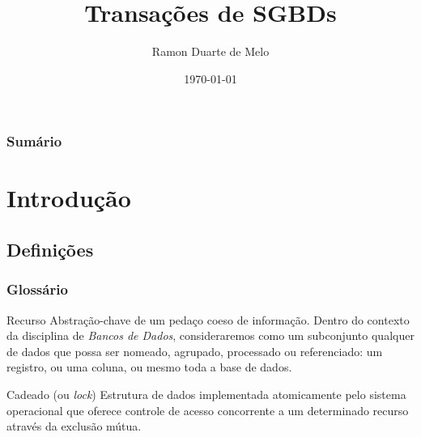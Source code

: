 \documentclass{beamer}
\title[Transações]{Transações de SGBDs} %
\author{Ramon Duarte de Melo} %
\institute[UFRJ] %
{
    Universidade Federal do Rio de Janeiro \\ %
    \medskip
    \textit{ramonduarte@poli.ufrj.br} %
}
\date{\today} %
\begin{document}
\begin{frame} %
    \titlepage %
\end{frame}

\begin{frame} %
    \frametitle{Sumário} %
    \tableofcontents %
\end{frame}


\section{Introdução} %

\subsection{Definições} %

\begin{frame} %
    \frametitle{Glossário}
    
    \begin{block}{Recurso}
        Abstração-chave de um pedaço coeso de informação. Dentro do contexto da disciplina de \emph{Bancos de Dados}, consideraremos como um subconjunto qualquer de dados que possa ser nomeado, agrupado, processado ou referenciado: um registro, ou uma coluna, ou mesmo toda a base de dados. 
    \end{block}
    \begin{block}{Cadeado (ou \emph{lock})}
        Estrutura de dados implementada atomicamente pelo sistema operacional que oferece controle de acesso concorrente a um determinado recurso através da exclusão mútua.
    \end{block}
\end{frame}
\end{document}
